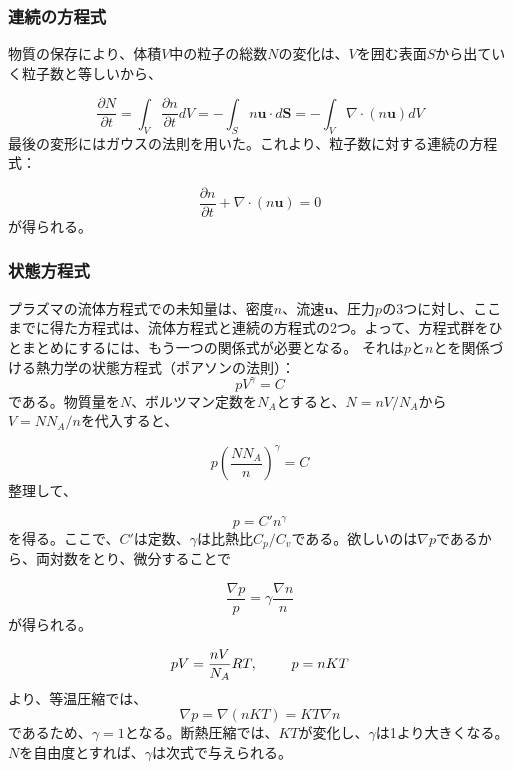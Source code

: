 \documentclass{ltjsarticle}
\numberwithin{equation}{section} %
\begin{document}
\subsubsection{連続の方程式} \label{section3.3.5}
物質の保存により、体積$V$中の粒子の総数$N$の変化は、$V$を囲む表面$S$から出ていく粒子数と等しいから、

\begin{equation}
  \frac{\partial N}{\partial t} = \int_{V}\frac{\partial n}{\partial t}dV = -\int_{S} n\bm{u}\cdot d\bm{S} = -\int_{V}\nabla \cdot (n\bm{u})dV \label{3.49} 
\end{equation}
最後の変形にはガウスの法則を用いた。これより、粒子数に対する連続の方程式：

\begin{equation}
  \frac{\partial n}{\partial t} + \nabla \cdot (n\bm{u}) = 0 \label{3.50}
\end{equation}
が得られる。


\subsubsection{状態方程式} \label{section3.3.6}
プラズマの流体方程式での未知量は、密度$n$、流速$\bm{u}$、圧力$p$の3つに対し、ここまでに得た方程式は、流体方程式と連続の方程式の2つ。よって、方程式群をひとまとめにするには、もう一つの関係式が必要となる。
それは$p$と$n$とを関係づける熱力学の状態方程式（ポアソンの法則）：
\begin{equation}
  pV^\gamma = C
\end{equation}
である。物質量を$N$、ボルツマン定数を$N_A$とすると、$N = nV/ N_A$から$V = NN_A/n$を代入すると、

\[
  p\left(\frac{NN_A}{n}\right)^\gamma = C
\]
整理して、

\begin{equation}
  p = C'n^\gamma \label{3.51}
\end{equation}
を得る。ここで、$C'$は定数、$\gamma$は比熱比$C_p/C_v$である。欲しいのは$\nabla p$であるから、両対数をとり、微分することで

\begin{equation}
  \frac{\nabla p}{p} = \gamma \frac{\nabla n}{n} \label{3.52}
\end{equation}
が得られる。

\[
  pV = \frac{nV}{N_A}RT , \hspace{2pc} p = nKT
\]
より、等温圧縮では、
\[
  \nabla p = \nabla (nKT) = KT\nabla n
\]
であるため、$\gamma = 1$となる。断熱圧縮では、$KT$が変化し、$\gamma$は1より大きくなる。$N$を自由度とすれば、$\gamma$は次式で与えられる。
\end{document}
